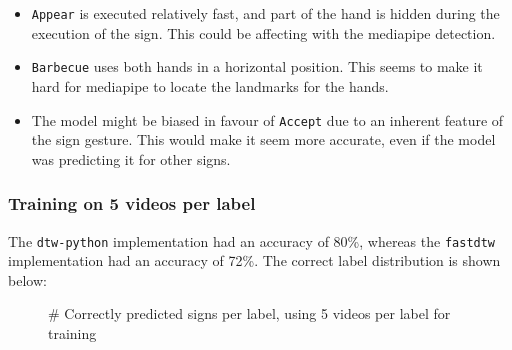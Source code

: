 \documentclass[final,rdr32.tex]{subfiles}
\begin{document}
\begin{itemize}
    \item \verb|Appear| is executed relatively fast, and part of the hand is hidden during the execution of the sign. This could be affecting with the mediapipe detection.
    \item \verb|Barbecue| uses both hands in a horizontal position. This seems to make it hard for mediapipe to locate the landmarks for the hands.
    \item The model might be biased in favour of \verb|Accept| due to an inherent feature of the sign gesture. This would make it seem more accurate, even if the model was predicting it for other signs.
\end{itemize}



\subsubsection{Training on 5 videos per label}
\label{sec:fivevid}

The \verb|dtw-python| implementation had an accuracy of 80\%, whereas the \verb|fastdtw| implementation had an accuracy of 72\%. The correct label distribution is shown below:
\begin{figure}[H]
    \begin{center}
    \end{center}
    \caption{\# Correctly predicted signs per label, using 5 videos per label for training}
    \label{bar:two}
\end{figure}
\end{document}
